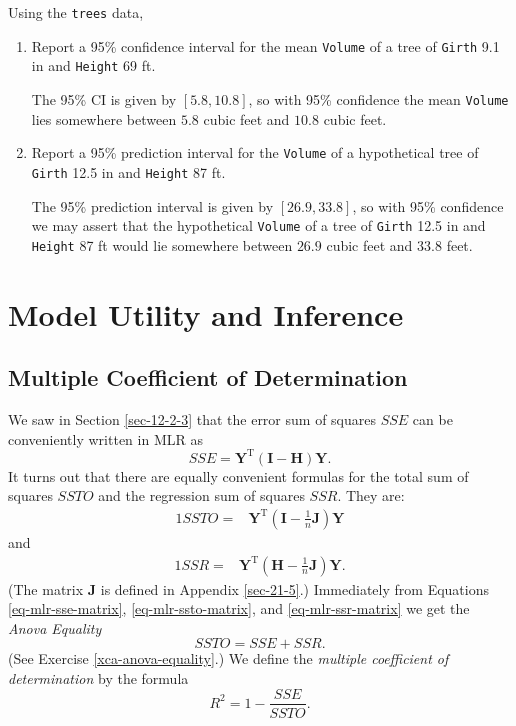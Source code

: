 \documentclass[captions=tableheading]{scrbook}
\begin{document}
\begin{example}
Using the \texttt{trees} data, 

\begin{enumerate}
\item Report a 95\% confidence interval for the mean \texttt{Volume} of a tree of \texttt{Girth} 9.1 in and \texttt{Height} 69 ft.

   The 95\% CI is given by \( [  5.8,  10.8 ] \), so with 95\% confidence the mean \texttt{Volume} lies somewhere between \(  5.8 \) cubic feet and \(  10.8 \) cubic feet.
\item Report a 95\% prediction interval for the \texttt{Volume} of a hypothetical tree of \texttt{Girth} 12.5 in and \texttt{Height} 87 ft.

   The 95\% prediction interval is given by \( [  26.9,  33.8 ] \), so with 95\% confidence we may assert that the hypothetical \texttt{Volume} of a tree of \texttt{Girth} 12.5 in and \texttt{Height} 87 ft would lie somewhere between \(  26.9 \) cubic feet and \(  33.8 \) feet.
\end{enumerate}

\end{example}
\section{Model Utility and Inference}
\label{sec-12-3}
\label{sec-Model-Utility-and-MLR}
\subsection{Multiple Coefficient of Determination}
\label{sec-12-3-1}


We saw in Section \ref{sec-12-2-3} that the error sum of squares \(SSE\) can be conveniently written in MLR as 
\begin{equation}
SSE=\mathbf{Y}^{\mathrm{T}}(\mathbf{I}-\mathbf{H})\mathbf{Y}.\label{eq-mlr-sse-matrix}
\end{equation}
It turns out that there are equally convenient formulas for the total sum of squares \(SSTO\) and the regression sum of squares \(SSR\). They are:
\begin{alignat}{1}
SSTO= & \mathbf{Y}^{\mathrm{T}}\left(\mathbf{I}-\frac{1}{n}\mathbf{J}\right)\mathbf{Y}\label{eq-mlr-ssto-matrix}
\end{alignat}
and
\begin{alignat}{1}
SSR= & \mathbf{Y}^{\mathrm{T}}\left(\mathbf{H}-\frac{1}{n}\mathbf{J}\right)\mathbf{Y}.\label{eq-mlr-ssr-matrix}
\end{alignat}
(The matrix \(\mathbf{J}\) is defined in Appendix \ref{sec-21-5}.) Immediately from Equations \ref{eq-mlr-sse-matrix}, \ref{eq-mlr-ssto-matrix}, and \ref{eq-mlr-ssr-matrix} we get the \emph{Anova Equality}
\begin{equation} 
SSTO=SSE+SSR.
\end{equation}
(See Exercise \ref{xca-anova-equality}.) We define the \emph{multiple coefficient of determination} by the formula
\begin{equation} 
R^{2}=1-\frac{SSE}{SSTO}.
\end{equation}
\end{document}
